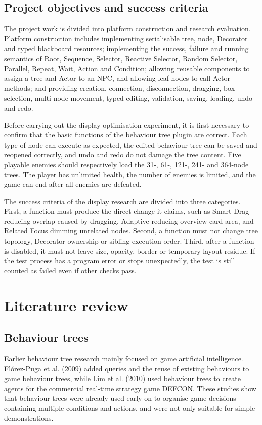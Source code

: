 \documentclass[11pt,a4paper,oneside,extrafontsizes]{memoir}
\begin{document}
\section{Project objectives and success criteria}

The project work is divided into platform construction and research evaluation. Platform construction includes implementing serialisable tree, node, Decorator and typed blackboard resources; implementing the success, failure and running semantics of Root, Sequence, Selector, Reactive Selector, Random Selector, Parallel, Repeat, Wait, Action and Condition; allowing reusable components to assign a tree and Actor to an NPC, and allowing leaf nodes to call Actor methods; and providing creation, connection, disconnection, dragging, box selection, multi-node movement, typed editing, validation, saving, loading, undo and redo.

Before carrying out the display optimisation experiment, it is first necessary to confirm that the basic functions of the behaviour tree plugin are correct. Each type of node can execute as expected, the edited behaviour tree can be saved and reopened correctly, and undo and redo do not damage the tree content. Five playable enemies should respectively load the 31-, 61-, 121-, 241- and 364-node trees. The player has unlimited health, the number of enemies is limited, and the game can end after all enemies are defeated.

The success criteria of the display research are divided into three categories. First, a function must produce the direct change it claims, such as Smart Drag reducing overlap caused by dragging, Adaptive reducing overview card area, and Related Focus dimming unrelated nodes. Second, a function must not change tree topology, Decorator ownership or sibling execution order. Third, after a function is disabled, it must not leave size, opacity, border or temporary layout residue. If the test process has a program error or stops unexpectedly, the test is still counted as failed even if other checks pass.

\chapter{Literature review}

\section{Behaviour trees}

Earlier behaviour tree research mainly focused on game artificial intelligence. Flórez-Puga et al. (2009) added queries and the reuse of existing behaviours to game behaviour trees, while Lim et al. (2010) used behaviour trees to create agents for the commercial real-time strategy game DEFCON. These studies show that behaviour trees were already used early on to organise game decisions containing multiple conditions and actions, and were not only suitable for simple demonstrations.
\end{document}
